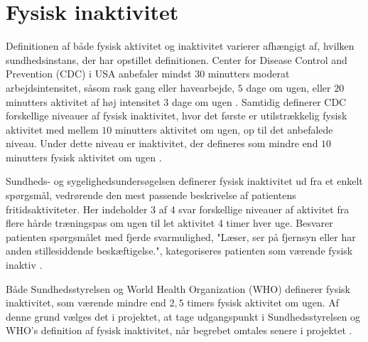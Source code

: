 \section{Fysisk inaktivitet}

Definitionen af både fysisk aktivitet og inaktivitet varierer afhængigt af, hvilken sundhedsinstans, der har opstillet definitionen. Center for Disease Control and Prevention (CDC) i USA anbefaler mindst $30$ minutters moderat arbejdsintensitet, såsom rask gang eller havearbejde, $5$ dage om ugen, eller $20$ minutters aktivitet af høj intensitet $3$ dage om ugen \citep{motionsraad2007,christensen2012}.
Samtidig definerer CDC forskellige niveauer af fysisk inaktivitet, hvor det første er utilstrækkelig fysisk aktivitet med mellem $10$ minutters aktivitet om ugen, op til det anbefalede niveau. Under dette niveau er inaktivitet, der defineres som mindre end $10$ minutters fysisk aktivitet om ugen \citep{motionsraad2007,christensen2012}.

Sundheds- og sygelighedsundersøgelsen definerer fysisk inaktivitet ud fra et enkelt spørgsmål, vedrørende den mest passende beskrivelse af patientens fritidsaktiviteter. Her indeholder $3$ af $4$ svar forskellige niveauer af aktivitet fra flere hårde træningspas om ugen til let aktivitet 4 timer hver uge. Besvarer patienten spørgsmålet med fjerde svarmulighed, "Læser, ser på fjernsyn eller har anden stillesiddende beskæftigelse.", kategoriseres patienten som værende fysisk inaktiv \citep{motionsraad2007,christensen2012}.

Både Sundhedsstyrelsen og World Health Organization (WHO) definerer fysisk inaktivitet, som værende mindre end $2,5$ timers fysisk aktivitet om ugen. Af denne grund vælges det i projektet, at tage udgangspunkt i Sundhedsstyrelsen og WHO's definition af fysisk inaktivitet, når begrebet omtales senere i projektet \citep{motionsraad2007}.